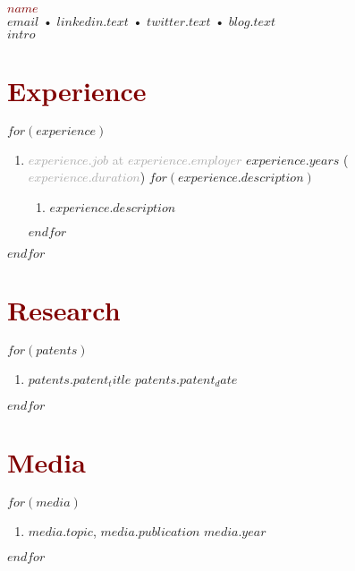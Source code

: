 \documentclass[$fontsize$, a4paper]{article}
\begin{document}
\textcolor{Maroon}{\LARGE \textbf{$name$}}\\[.3cm]
\textcolor{darkgray}{} \href{mailto:$email$}{$email$} • \textcolor{darkgray}{} \href{$linkedin.url$}{$linkedin.text$} • \textcolor{darkgray}{} \href{$twitter.url$}{$twitter.text$} • \textcolor{darkgray}{} \href{$blog.url$}{$blog.text$}\\[.3cm]
$intro$

\section*{\textcolor{Maroon}{Experience}}
$for(experience)$
  \begin{enumerate}
    [topsep=10pt,itemsep=0pt,parsep=0pt,partopsep=0pt,leftmargin=10pt,label=•]
    \item{\textcolor{darkgray}{\textbf{$experience.job$} at \textbf{$experience.employer$}} \hfill $experience.years$} ({\footnotesize{\textcolor{darkgray}{$experience.duration$}}})
    $for(experience.description)$
    \begin{enumerate}
      [topsep=0pt,itemsep=0pt,parsep=0pt,partopsep=0pt,leftmargin=10pt,label=•]
      \item{$experience.description$}
    \end{enumerate}
    $endfor$
  \end{enumerate}
$endfor$

\section*{\textcolor{Maroon}{Research}}
$for(patents)$
  \begin{enumerate}
    [topsep=0pt,itemsep=0pt,parsep=0pt,partopsep=0pt,leftmargin=10pt,label=•]
    \item{\href{$patents.patent_url$}{$patents.patent_title$} \hfill $patents.patent_date$}
  \end{enumerate}
$endfor$

\section*{\textcolor{Maroon}{Media}}
$for(media)$
  \begin{enumerate}
    [topsep=0pt,itemsep=0pt,parsep=0pt,partopsep=0pt,leftmargin=10pt,label=•]
    \item{$media.topic$, \href{$media.url$}{$media.publication$} \hfill $media.year$}
  \end{enumerate}
$endfor$
\end{document}
